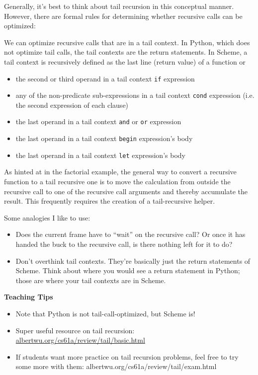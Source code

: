Generally, it's best to think about tail recursion in this conceptual manner. However, there are formal rules for determining whether recursive calls can be optimized: 

We can optimize recursive calls that are in a tail context. In Python, which does not optimize tail calls, the tail contexts are the return statements. In Scheme, a tail context is recursively defined as the last line (return value) of a function or 
\begin{itemize}
\item the second or third operand in a tail context \lstinline{if} expression
\item any of the non-predicate sub-expressions in a tail context \lstinline{cond} expression (i.e. the second expression of each clause)
\item the last operand in a tail context \lstinline{and} or \lstinline{or} expression
\item the last operand in a tail context \lstinline{begin} expression's body
\item the last operand in a tail context \lstinline{let} expression's body
\end{itemize}

As hinted at in the factorial example, the general way to convert a recursive function to a tail recursive one is to move the calculation from outside the recursive call to one of the recursive call arguments and thereby accumulate the result. This frequently requires the creation of a tail-recursive helper. 

\begin{guide}
\begin{blocksection}
  Some analogies I like to use:
  \begin{itemize}
    \item Does the current frame have to ``wait'' on the recursive call? Or once it has handed the buck to the recursive call, is there nothing left for it to do? 
    \item Don't overthink tail contexts. They're basically just the return statements of Scheme. Think about where you would see a return statement in Python; those are where your tail contexts are in Scheme. 
  \end{itemize}

\textbf{Teaching Tips}
  \begin{itemize}
    \item Note that Python is not tail-call-optimized, but Scheme is!
    \item Super useful resource on tail recursion: \url{albertwu.org/cs61a/review/tail/basic.html}
    \item If students want more practice on tail recursion problems, feel free to try some more with them: albertwu.org/cs61a/review/tail/exam.html
  \end{itemize}
\end{blocksection}
\end{guide}
